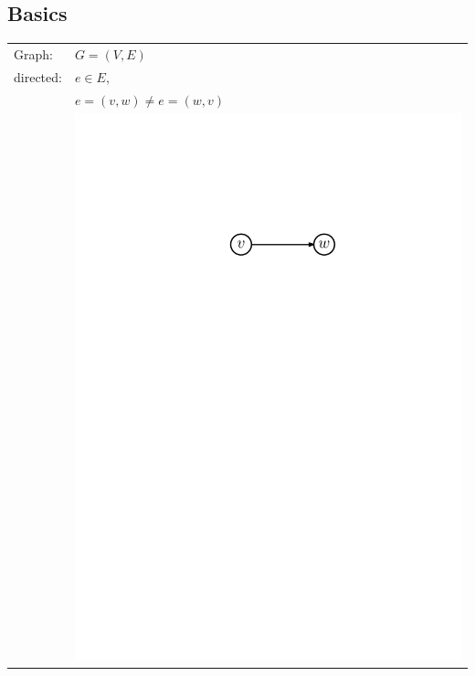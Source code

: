 
\subsection{Basics}

\begin{tabular}{l l}
Graph:& $G = (V,E)$ \\

directed:& $ e \in E,$ \\
	& $ e = (v,w) \neq e=(w,v)$ \\
	& \includegraphics[scale=.5]{01_graph_theory/pics/directed-graph_edge.pdf}\\


\end{tabular}
